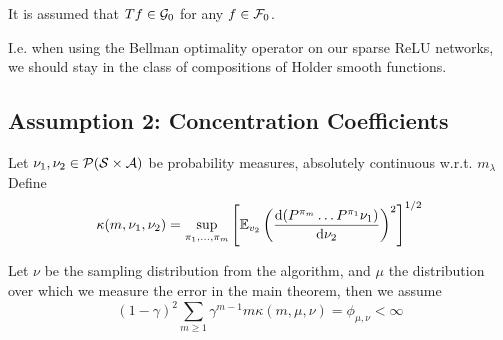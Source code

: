 \begin{asm}\label{asm:A1}
	It is assumed that $T f \in \mathcal{G}_0$ for any $f \in \mathcal{F}_0$.

	I.e. when using the Bellman optimality operator on our sparse ReLU networks,
	we should stay in the class of compositions of Holder smooth functions.
\end{asm}

\subsection{Assumption 2: Concentration Coefficients}

\begin{defn}
	Let $\nu_1, \nu_2 \in \mathcal{P}(\mathcal{S}\times \mathcal{A})$ be probability measures,
	absolutely continuous w.r.t. $m_{\lambda}$
	Define
	\[ \kappa(m, \nu_1, \nu_2) = \sup_{\pi_1, \dots, \pi_m}
		\left[ \mathbb{E}_{v_2} \left( \frac{\mathrm{d} (P^{\pi_m} \dots P^{\pi_1} \nu_1)}
		{\mathrm{d} \nu_2} \right)^2 \right]^{1/2} \]
\end{defn}

\begin{asm}\label{asm:A2}
	Let $\nu$ be the sampling distribution from the algorithm, and $\mu$ the distribution
	over which we measure the error in the main theorem, then we assume
	\[ (1 - \gamma)^2 \sum_{m\geq 1} \gamma^{m-1} m \kappa(m, \mu, \nu)
		= \phi_{\mu, \nu} < \infty \]
\end{asm}


